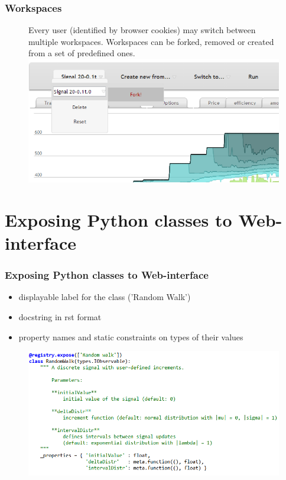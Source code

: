 \documentclass{beamer}
\begin{document}
\begin{frame}
\frametitle{Workspaces}
\begin{figure}[htbp]
Every user (identified by browser cookies) may switch between multiple workspaces. Workspaces can be forked, removed or created from a set of predefined ones.
\centering
\includegraphics[width=1\linewidth]{js-fork.png}
\end{figure}
\end{frame}

\section{Exposing Python classes to Web-interface}
\begin{frame}
\frametitle{Exposing Python classes to Web-interface}
\begin{itemize}
  \item displayable label for the class ('Random Walk')
  \item docstring in rst format
  \item property names and static constraints on types of their values
\end{itemize}
\begin{figure}[htbp]
\centering
\includegraphics[width=1\linewidth]{metainfo.png}
\end{figure}
\end{frame}
\end{document}
